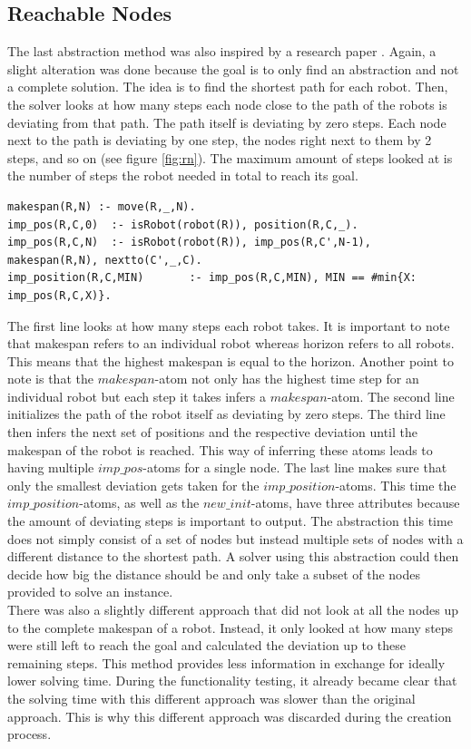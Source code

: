 \documentclass[runningheads]{llncs}
\begin{document}
\subsection{Reachable Nodes}
The last abstraction method was also inspired by a research paper \cite{rn}. Again, a slight alteration was done because the goal is to only find an abstraction and not a complete solution. The idea is to find the shortest path for each robot. Then, the solver looks at how many steps each node close to the path of the robots is deviating from that path. The path itself is deviating by zero steps. Each node next to the path is deviating by one step, the nodes right next to them by 2  steps, and so on (see figure \ref{fig:rn}). The maximum amount of steps looked at is the number of steps the robot needed in total to reach its goal. 
\begin{verbatim}
makespan(R,N) :- move(R,_,N).
imp_pos(R,C,0) 	:- isRobot(robot(R)), position(R,C,_).
imp_pos(R,C,N) 	:- isRobot(robot(R)), imp_pos(R,C',N-1), makespan(R,N), nextto(C',_,C).
imp_position(R,C,MIN) 		:- imp_pos(R,C,MIN), MIN == #min{X: imp_pos(R,C,X)}.
\end{verbatim}
The first line looks at how many steps each robot takes. It is important to note that makespan refers to an individual robot whereas horizon refers to all robots. This means that the highest makespan is equal to the horizon. Another point to note is that the $makespan$-atom not only has the highest time step for an individual robot but each step it takes infers a $makespan$-atom. The second line initializes the path of the robot itself as deviating by zero steps. The third line then infers the next set of positions and the respective deviation until the makespan of the robot is reached. This way of inferring these atoms leads to having multiple $imp\_pos$-atoms for a single node. The last line makes sure that only the smallest deviation gets taken for the $imp\_position$-atoms. This time the $imp\_position$-atoms, as well as the $new\_init$-atoms, have three attributes because the amount of deviating steps is important to output. The abstraction this time does not simply consist of a set of nodes but instead multiple sets of nodes with a different distance to the shortest path. A solver using this abstraction could then decide how big the distance should be and only take a subset of the nodes provided to solve an instance. \\
There was also a slightly different approach that did not look at all the nodes up to the complete makespan of a robot. Instead, it only looked at how many steps were still left to reach the goal and calculated the deviation up to these remaining steps. This method provides less information in exchange for ideally lower solving time. During the functionality testing, it already became clear that the solving time with this different approach was slower than the original approach. This is why this different approach was discarded during the creation process.
\end{document}
